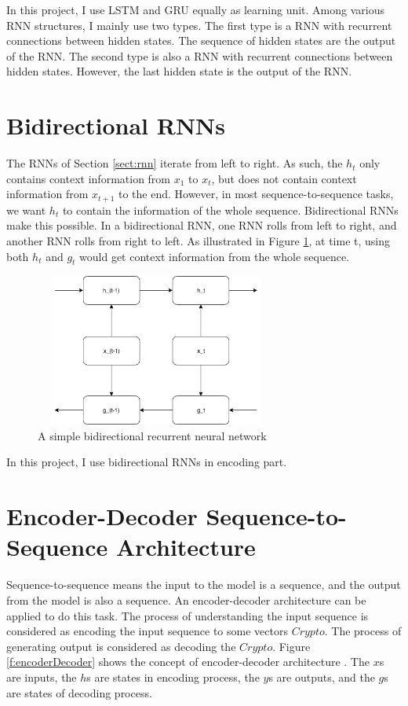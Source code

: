 \documentclass[modernstyle,12pt]{sjsuthesis}
\theoremstyle{definition}
\begin{document}
In this project, I use LSTM and GRU equally as learning unit. Among various RNN structures, I mainly use two types. The first type is a RNN with recurrent connections between hidden states. The sequence of hidden states are the output of the RNN. The second type is also a RNN with recurrent connections between hidden states. However, the last hidden state is the output of the RNN.

\section{Bidirectional RNNs}

The RNNs of Section \ref{sect:rnn}
iterate from left to right. As such, the $h_t$ only contains context information from $x_1$ to $x_t$, but does not contain context information from $x_{t+1}$ to the end. However, in most sequence-to-sequence tasks, we want $h_t$ to contain the information of the whole sequence. Bidirectional RNNs make this possible. In a bidirectional RNN, one RNN rolls from left to right, and another RNN rolls from right to left. As illustrated in Figure \ref{f:bidirectionalRnn}, at time t, using both $h_t$ and $g_t$ would get context information from the whole sequence.

\begin{figure}[htbp]\centering
  \includegraphics[width=8cm, height=5cm]{figures/bidirectionalRnn.png}
  \caption{A simple bidirectional recurrent neural network}
  \label{f:bidirectionalRnn}
\end{figure}

In this project, I use bidirectional RNNs in encoding part.

\section{Encoder-Decoder Sequence-to-Sequence Architecture}

Sequence-to-sequence means the input to the model is a sequence, and the output from the model is also a sequence. An encoder-decoder architecture can be applied to do this task. The process of understanding the input sequence is considered as encoding the input sequence to some vectors $Crypto$. The process of generating output is considered as decoding the $Crypto$. Figure \ref{f:encoderDecoder} shows the concept of encoder-decoder architecture . The $x$s are inputs, the $h$s are states in encoding process, the $y$s are outputs, and the $g$s are states of decoding process.
\end{document}
